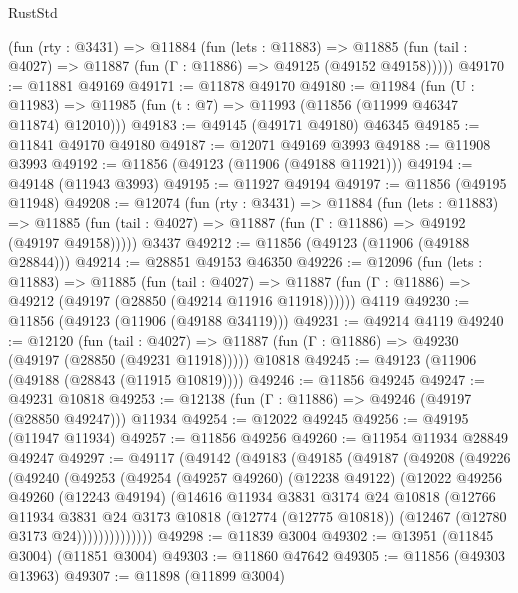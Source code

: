 \begin{lexlean}{RustStd}
\begin{coremodule}
    (fun (rty : @3431) =>
    @11884
      (fun (lets : @11883) =>
      @11885 (fun (tail : @4027) => @11887 (fun (Γ : @11886) => @49125 (@49152 @49158)))))
@49170 := @11881 @49169
@49171 := @11878 @49170
@49180 := @11984
    (fun (U : @11983) => @11985 (fun (t : @7) => @11993 (@11856 (@11999 @46347 @11874) @12010)))
@49183 := @49145 (@49171 @49180) @46345
@49185 := @11841 @49170 @49180
@49187 := @12071 @49169 @3993
@49188 := @11908 @3993
@49192 := @11856 (@49123 (@11906 (@49188 @11921)))
@49194 := @49148 (@11943 @3993)
@49195 := @11927 @49194
@49197 := @11856 (@49195 @11948)
@49208 := @12074
    (fun (rty : @3431) =>
    @11884
      (fun (lets : @11883) =>
      @11885 (fun (tail : @4027) => @11887 (fun (Γ : @11886) => @49192 (@49197 @49158)))))
    @3437
@49212 := @11856 (@49123 (@11906 (@49188 @28844)))
@49214 := @28851 @49153 @46350
@49226 := @12096
    (fun (lets : @11883) =>
    @11885
      (fun (tail : @4027) =>
      @11887 (fun (Γ : @11886) => @49212 (@49197 (@28850 (@49214 @11916 @11918))))))
    @4119
@49230 := @11856 (@49123 (@11906 (@49188 @34119)))
@49231 := @49214 @4119
@49240 := @12120
    (fun (tail : @4027) => @11887 (fun (Γ : @11886) => @49230 (@49197 (@28850 (@49231 @11918)))))
    @10818
@49245 := @49123 (@11906 (@49188 (@28843 (@11915 @10819))))
@49246 := @11856 @49245
@49247 := @49231 @10818
@49253 := @12138 (fun (Γ : @11886) => @49246 (@49197 (@28850 @49247))) @11934
@49254 := @12022 @49245
@49256 := @49195 (@11947 @11934)
@49257 := @11856 @49256
@49260 := @11954 @11934 @28849 @49247
@49297 := @49117
    (@49142
      (@49183
        (@49185
          (@49187
            (@49208
              (@49226
                (@49240
                  (@49253
                    (@49254
                      (@49257 @49260)
                      (@12238 @49122)
                      (@12022
                        @49256
                        @49260
                        (@12243 @49194)
                        (@14616
                          @11934
                          @3831
                          @3174
                          @24
                          @10818
                          (@12766
                            @11934
                            @3831
                            @24
                            @3173
                            @10818
                            (@12774 (@12775 @10818))
                            (@12467 (@12780 @3173 @24))))))))))))))
@49298 := @11839 @3004
@49302 := @13951 (@11845 @3004) (@11851 @3004)
@49303 := @11860 @47642
@49305 := @11856 (@49303 @13963)
@49307 := @11898 (@11899 @3004)

\end{coremodule}
\end{lexlean}
